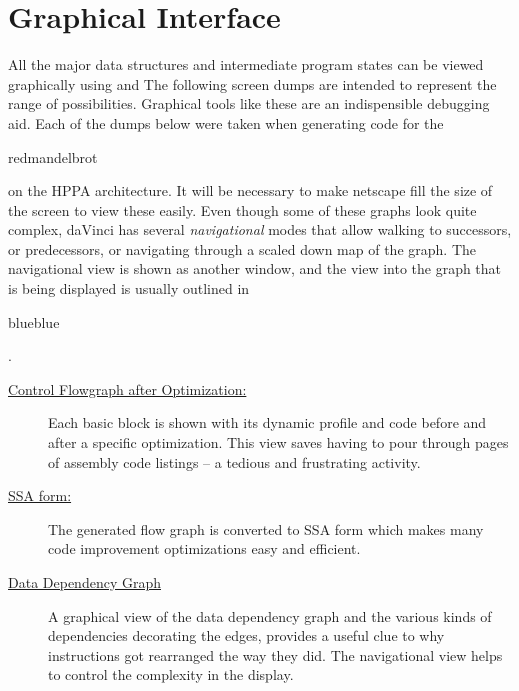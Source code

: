\section{Graphical Interface}
  All the major data structures and intermediate program states can be
  viewed graphically using 
     and
  The following screen dumps are intended to represent the range of
  possibilities. Graphical tools like these are an indispensible
  debugging aid. Each of the dumps below were taken when generating
  code for the \begin{color}{red}mandelbrot\end{color} on the HPPA
  architecture. It will be necessary to make netscape fill the size of
  the screen to view these easily. Even though some of these graphs
  look quite complex, daVinci has several \emph{navigational} modes
  that allow walking to successors, or predecessors, or navigating
  through a scaled down map of the graph. The navigational view is
shown as another window, and the view into the graph that is being
displayed is usually outlined in \begin{color}{blue}blue\end{color}.

  \begin{description}
   \item[\href{graphics/mandelbrot-opt.gif}{Control Flowgraph after Optimization:}] Each basic block is shown with its dynamic profile and
    code before and after a specific optimization. This view
    saves having to pour through pages of assembly code listings -- 
    a tedious and frustrating activity.
   \item[\href{graphics/mandelbrot-ssa.gif}{SSA form:}]
     The generated flow graph is converted to SSA form which
makes many code improvement optimizations easy and efficient.
   \item[\href{graphics/mandelbrot-ddg.gif}{Data Dependency Graph}]
         A graphical view of the data dependency graph and the various
kinds of dependencies decorating the edges, provides a useful clue to
why instructions got rearranged the way they did. The navigational
view helps to control the complexity in the display.
  \end{description}
